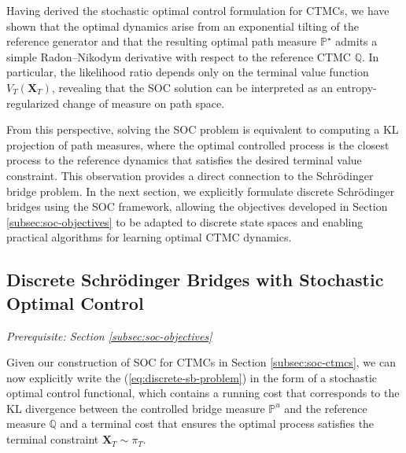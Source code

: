 \documentclass{article}
\begin{document}
Having derived the stochastic optimal control formulation for CTMCs, we have shown that the optimal dynamics arise from an exponential tilting of the reference generator and that the resulting optimal path measure $\mathbb{P}^\star$ admits a simple Radon–Nikodym derivative with respect to the reference CTMC $\mathbb{Q}$. In particular, the likelihood ratio depends only on the terminal value function $V_T(\boldsymbol{X}_T)$, revealing that the SOC solution can be interpreted as an entropy-regularized change of measure on path space. 

From this perspective, solving the SOC problem is equivalent to computing a KL projection of path measures, where the optimal controlled process is the closest process to the reference dynamics that satisfies the desired terminal value constraint. This observation provides a direct connection to the Schrödinger bridge problem. In the next section, we explicitly formulate discrete Schrödinger bridges using the SOC framework, allowing the objectives developed in Section \ref{subsec:soc-objectives} to be adapted to discrete state spaces and enabling practical algorithms for learning optimal CTMC dynamics.

\subsection{Discrete Schrödinger Bridges with Stochastic Optimal Control}
\label{subsec:discrete-sb-soc}
\textit{Prerequisite: Section \ref{subsec:soc-objectives}}

Given our construction of SOC for CTMCs in Section \ref{subsec:soc-ctmcs}, we can now explicitly write the (\ref{eq:discrete-sb-problem}) in the form of a stochastic optimal control functional, which contains a running cost that corresponds to the KL divergence between the controlled bridge measure $\mathbb{P}^u$ and the reference measure $\mathbb{Q}$ and a terminal cost that ensures the optimal process satisfies the terminal constraint $\boldsymbol{X}_T\sim \pi_T$.
\end{document}
